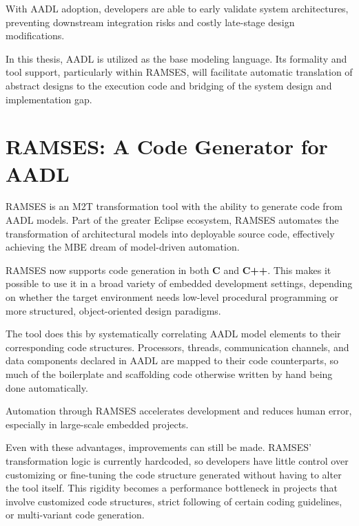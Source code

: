 \begin{tcolorbox}[colback=blue!5, colframe=blue!40!black] With \gls{AADL} adoption, developers are able to early validate system architectures, preventing downstream integration risks and costly late-stage design modifications.  \end{tcolorbox}

\par
In this thesis, \gls{AADL} is utilized as the base modeling language. Its formality and tool support, particularly within RAMSES, will facilitate automatic translation of abstract designs to the execution code and bridging of the system design and implementation gap.


\section{RAMSES: A Code Generator for AADL} \label{sec:ramses}

\gls{RAMSES} is an \gls{M2T} transformation tool with the ability to generate code from \gls{AADL} models. Part of the greater Eclipse ecosystem, \gls{RAMSES} automates the transformation of architectural models into deployable source code, effectively achieving the \gls{MBE} dream of model-driven automation\cite{MEM4CSD}.
\par 
\gls{RAMSES} now supports code generation in both \textbf{C} and \textbf{C++}. This makes it possible to use it in a broad variety of embedded development settings, depending on whether the target environment needs low-level procedural programming or more structured, object-oriented design paradigms.
\par 
The tool does this by systematically correlating \gls{AADL} model elements to their corresponding code structures. Processors, threads, communication channels, and data components declared in \gls{AADL} are mapped to their code counterparts, so much of the boilerplate and scaffolding code otherwise written by hand being done automatically.

\begin{tcolorbox}[colback=green!5, colframe=green!40!black] Automation through \gls{RAMSES} accelerates development and reduces human error, especially in large-scale embedded projects. \end{tcolorbox}

Even with these advantages, improvements can still be made. \gls{RAMSES}' transformation logic is currently hardcoded, so developers have little control over customizing or fine-tuning the code structure generated without having to alter the tool itself. This rigidity becomes a performance bottleneck in projects that involve customized code structures, strict following of certain coding guidelines, or multi-variant code generation.


